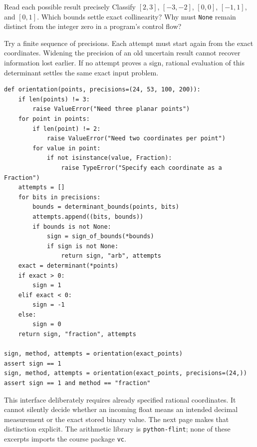 \begin{question}{Read each possible result precisely}
Classify $[2,3]$, $[-3,-2]$, $[0,0]$, $[-1,1]$, and $[0,1]$.
Which bounds settle exact collinearity? Why must \texttt{None} remain
distinct from the integer zero in a program's control flow?
\end{question}


\newpage
{}
Try a finite sequence of precisions. Each attempt must start again from the
exact coordinates. Widening the precision of an old uncertain result cannot
recover information lost earlier. If no attempt proves a sign, rational
evaluation of this determinant settles the same exact input problem.
\begin{lstlisting}
def orientation(points, precisions=(24, 53, 100, 200)):
    if len(points) != 3:
        raise ValueError("Need three planar points")
    for point in points:
        if len(point) != 2:
            raise ValueError("Need two coordinates per point")
        for value in point:
            if not isinstance(value, Fraction):
                raise TypeError("Specify each coordinate as a Fraction")
    attempts = []
    for bits in precisions:
        bounds = determinant_bounds(points, bits)
        attempts.append((bits, bounds))
        if bounds is not None:
            sign = sign_of_bounds(*bounds)
            if sign is not None:
                return sign, "arb", attempts
    exact = determinant(*points)
    if exact > 0:
        sign = 1
    elif exact < 0:
        sign = -1
    else:
        sign = 0
    return sign, "fraction", attempts

sign, method, attempts = orientation(exact_points)
assert sign == 1
sign, method, attempts = orientation(exact_points, precisions=(24,))
assert sign == 1 and method == "fraction"
\end{lstlisting}

This interface deliberately requires already specified rational coordinates.
It cannot silently decide whether an incoming float means an intended
decimal measurement or the exact stored binary value. The next page makes
that distinction explicit. The arithmetic library is \texttt{python-flint};
none of these excerpts imports the course package \texttt{vc}.

